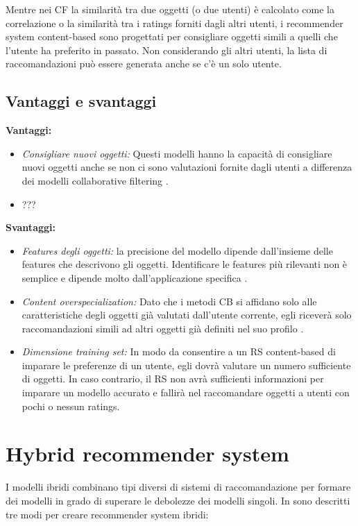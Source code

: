 \documentclass[12pt,italian]{report}
\begin{document}
Mentre nei CF la similarità tra due oggetti (o due utenti) è calcolato come la correlazione o la similarità tra i ratings forniti dagli altri utenti, i recommender system content-based sono progettati per consigliare oggetti simili a quelli che l'utente ha preferito in passato. Non considerando gli altri utenti, la lista di raccomandazioni può essere generata anche se c'è un solo utente.

\subsection{Vantaggi e svantaggi}
\textbf{Vantaggi:}
\begin{itemize}
 \item \textit{Consigliare nuovi oggetti:} Questi modelli hanno la capacità di consigliare nuovi oggetti anche se non ci sono valutazioni fornite dagli utenti a differenza dei modelli collaborative filtering \cite{recsys-principle-methods-evaluation}.

 \item ???
\end{itemize}

\noindent \textbf{Svantaggi:}
\begin{itemize}
 \item \textit{Features degli oggetti:} la precisione del modello dipende dall'insieme delle features che descrivono gli oggetti. Identificare le features più rilevanti non è semplice e dipende molto dall'applicazione specifica \cite{survey-mattia}.
 
 \item \textit{Content overspecialization:} Dato che i metodi CB si affidano solo alle caratteristiche degli oggetti già valutati dall'utente corrente, egli riceverà solo raccomandazioni simili ad altri oggetti già definiti nel suo profilo \cite{recsys-principle-methods-evaluation}.
 
 \item \textit{Dimensione training set:} In modo da consentire a un RS content-based di imparare le preferenze di un utente, egli dovrà valutare un numero sufficiente di oggetti. In caso contrario, il RS non avrà sufficienti informazioni per imparare un modello accurato e fallirà nel raccomandare oggetti a utenti con pochi o nessun ratings.
\end{itemize}

\section{Hybrid recommender system}
I modelli ibridi combinano tipi diversi di sistemi di raccomandazione per formare dei modelli in grado di superare le debolezze dei modelli singoli. In \cite{recsys-book} sono descritti tre modi per creare recommender system ibridi:
\end{document}
